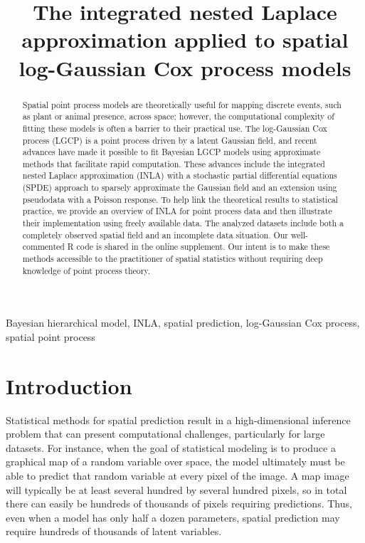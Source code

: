 \documentclass{interact}
\begin{document}

\title{The integrated nested Laplace approximation applied to spatial log-Gaussian Cox process models}

\author{
}

\maketitle

\begin{abstract}
Spatial point process models are theoretically useful for mapping discrete
events, such as plant or animal presence, across space; however, the computational
complexity of fitting these models is often a barrier to their practical use.
The log-Gaussian Cox process (LGCP) is a point process driven by a latent
Gaussian field, and recent advances have made it possible to fit Bayesian LGCP
models using approximate methods that facilitate rapid computation. These advances
include the integrated nested Laplace approximation (INLA) with a
stochastic partial differential equations (SPDE) approach to
sparsely approximate the Gaussian field and an extension using pseudodata with
a Poisson response. To help link the theoretical results to statistical
practice, we provide an overview of INLA for point process data 
and then illustrate their implementation using freely available data. 
The analyzed datasets include both a completely observed spatial field
 and an incomplete data situation. Our well-commented R
code is shared in the online supplement. Our intent is to make these methods
accessible to the practitioner of spatial statistics without requiring deep
knowledge of point process theory.
\end{abstract}

\begin{keywords}
Bayesian hierarchical model, INLA, spatial prediction, log-Gaussian Cox process, spatial point process
\end{keywords}


\section{Introduction}
\label{intro}

Statistical methods for spatial prediction result in a high-dimensional
inference problem that can present computational challenges, particularly for
large datasets. For instance, when the goal of statistical modeling is to
produce a graphical map of a random variable over space, the model ultimately
must be able to predict that random variable at every pixel of the image. A map
image will typically be at least several hundred by several hundred pixels, so
in total there can easily be hundreds of thousands of pixels requiring
predictions. Thus, even when a model has only half a dozen parameters, spatial
prediction may require hundreds of thousands of latent variables.
\end{document}
